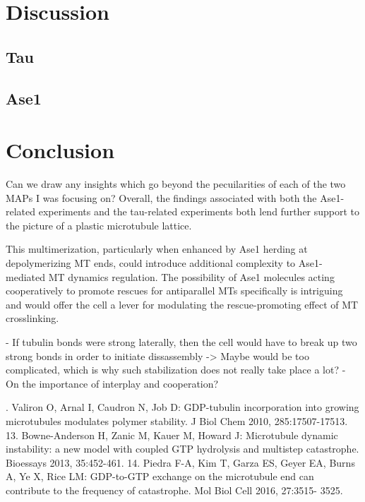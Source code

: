 \chapter{Discussion}
\section{Tau}

\section{Ase1}


\chapter{Conclusion}
Can we draw any insights which go beyond the pecuilarities of each of the two MAPs I was focusing on? Overall, the findings associated with both the Ase1-related experiments and the tau-related experiments both lend further support to the picture of a plastic microtubule lattice. 

This multimerization, particularly when enhanced by Ase1 herding at depolymerizing MT ends, could introduce additional complexity to Ase1-mediated MT dynamics regulation. The possibility of Ase1 molecules acting cooperatively to promote rescues for antiparallel MTs specifically is intriguing and would offer the cell a lever for modulating the rescue-promoting effect of MT crosslinking.


- If tubulin bonds were strong laterally, then the cell would have to break up two strong bonds in order to initiate dissassembly -> Maybe would be too complicated, which is why such stabilization does not really take place a lot?
- On the importance of interplay and cooperation?

. Valiron O, Arnal I, Caudron N, Job D: GDP-tubulin incorporation
into growing microtubules modulates polymer stability. J Biol
Chem 2010, 285:17507-17513.
13. Bowne-Anderson H, Zanic M, Kauer M, Howard J: Microtubule
dynamic instability: a new model with coupled GTP hydrolysis
and multistep catastrophe. Bioessays 2013, 35:452-461.
14. Piedra F-A, Kim T, Garza ES, Geyer EA, Burns A, Ye X, Rice LM:
GDP-to-GTP exchange on the microtubule end can contribute
to the frequency of catastrophe. Mol Biol Cell 2016, 27:3515-
3525.